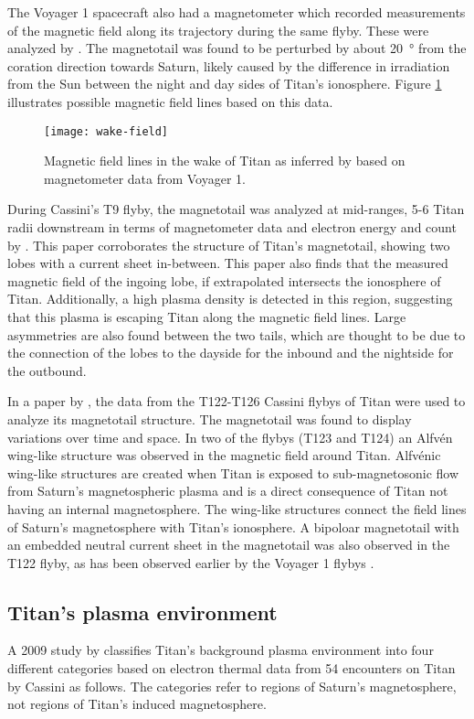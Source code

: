 \documentclass[12pt, parskip=full*, abstract]{scrartcl}
\begin{document}
The Voyager 1 spacecraft also had a magnetometer which recorded measurements of the magnetic field along its trajectory during the same flyby. These were analyzed by \textcite{ness-1982}. The magnetotail was found to be perturbed by about \SI{20}{\degree} from the coration direction towards Saturn, likely caused by the difference in irradiation from the Sun between the night and day sides of Titan's ionosphere. Figure \ref{fig:wake-field} illustrates possible magnetic field lines based on this data.

\begin{figure}[htbp]
	\centering
	\texttt{[image: wake-field]}
	\caption{Magnetic field lines in the wake of Titan as inferred by \textcite{ness-1982} based on magnetometer data from Voyager 1.}
	\label{fig:wake-field}
\end{figure}

During Cassini's T9 flyby, the magnetotail was analyzed at mid-ranges, 5-6 Titan radii downstream in terms of magnetometer data and electron energy and count by \textcite{Magnetotail-T9}. This paper corroborates the structure of Titan's magnetotail, showing two lobes with a current sheet in-between. This paper also finds that the measured magnetic field of the ingoing lobe, if extrapolated intersects the ionosphere of Titan. Additionally, a high plasma density is detected in this region, suggesting that this plasma is escaping Titan along the magnetic field lines. Large asymmetries are also found
between the two tails, which are thought to be due to the connection of the lobes to the dayside for the inbound and the nightside for the outbound.

In a paper by \textcite{alfven-wing-structure}, the data from the T122-T126 Cassini flybys of Titan were used to analyze its magnetotail structure. The magnetotail was found to display variations over time and space. In two of the flybys (T123 and T124) an Alfvén wing-like structure was observed in the magnetic field around Titan. Alfvénic wing-like structures are created when Titan is exposed to sub-magnetosonic flow from Saturn's magnetospheric plasma and is a direct consequence of Titan not having an internal magnetosphere. The wing-like structures connect the field lines of Saturn's magnetosphere with Titan's ionosphere. A bipoloar magnetotail with an embedded neutral current sheet in the magnetotail was also observed in the T122 flyby, as has been observed earlier by the Voyager 1 flybys \parencite{ness-1982}.

\subsection{Titan's plasma environment}
A 2009 study by \textcite{Rymer-class} classifies Titan's background plasma environment into four different categories based on electron thermal data from 54 encounters on Titan by Cassini as follows. The categories refer to regions of Saturn's magnetosphere, not regions of Titan's induced magnetosphere. 
\end{document}
